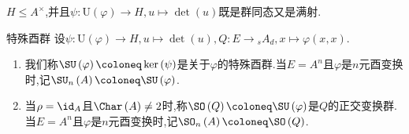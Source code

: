 \begin{lemma}{}{}
	$H\leq A^{\times}$,并且$\psi:\mathrm{U}\left(\varphi\right)\to H,u\mapsto\det\left(u\right)$既是群同态又是满射.
\end{lemma}

\begin{definition}{特殊酉群}{}
	设$\psi:\mathrm{U}\left(\varphi\right)\to H,u\mapsto\det\left(u\right),Q:E\to {}_{s}A_{d},x\mapsto\varphi\left(x,x\right)$.
	\begin{enumerate}
		\item 我们称$\SU\left(\varphi\right)\coloneq\ker\left(\psi\right)$是关于$\varphi$的特殊酉群.当$E=A^{n}$且$\varphi$是$n$元酉变换时,记$\SU_{n}\left(A\right)\coloneq\SU\left(\varphi\right)$.
		\item 当$\rho=\id_{A}$且$\Char\left(A\right)\neq 2$时,称$\SO\left(Q\right)\coloneq\SU\left(\varphi\right)$是$Q$的正交变换群.当$E=A^{n}$且$\varphi$是$n$元酉变换时,记$\SO_{n}\left(A\right)\coloneq\SO\left(Q\right)$.
	\end{enumerate}
\end{definition}